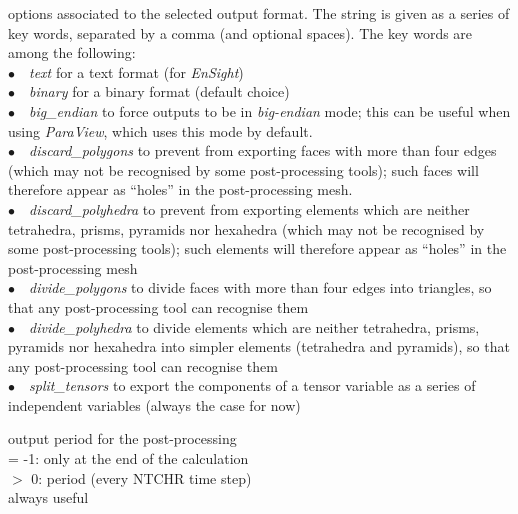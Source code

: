  {options associated to the selected output format. The string is given as a
 series of key words, separated by a comma (and optional spaces). The key words
 are among the following:\\
 \hspace*{1.3cm}$\bullet\quad${\em text} for a text format (for {\em EnSight})\\
 \hspace*{1.3cm}$\bullet\quad${\em binary} for a binary format (default choice)\\
 \hspace*{1.3cm}$\bullet\quad${\em big\_endian} to force outputs to be in {\em big-endian}
 mode; this can be useful when using {\em ParaView}, which uses this mode by default.\\
 \hspace*{1.3cm}$\bullet\quad${\em discard\_polygons} to prevent from exporting faces with more
 than four edges (which may not be recognised by some post-processing tools); such
 faces will therefore appear as ``holes'' in the post-processing mesh.\\
 \hspace*{1.3cm}$\bullet\quad${\em discard\_polyhedra} to prevent from exporting elements which
 are neither tetrahedra, prisms, pyramids nor hexahedra (which may not be recognised by
 some post-processing tools); such elements will therefore appear as ``holes'' in
 the post-processing mesh\\
 \hspace*{1.3cm}$\bullet\quad${\em divide\_polygons} to divide faces with more than four edges
 into triangles, so that any post-processing tool can recognise them\\
 \hspace*{1.3cm}$\bullet\quad${\em divide\_polyhedra} to divide elements which are neither
 tetrahedra, prisms, pyramids nor hexahedra into simpler elements (tetrahedra and
 pyramids), so that any post-processing tool can recognise them\\
 \hspace*{1.3cm}$\bullet\quad${\em split\_tensors} to export the components of a tensor
 variable as a series of independent variables (always the case for now)}


{output period for the post-processing\\
\hspace*{1.3cm}= -1: only at the end of the calculation\\
\hspace*{1.3cm}$>$ 0: period (every NTCHR time step)\\
always useful}


